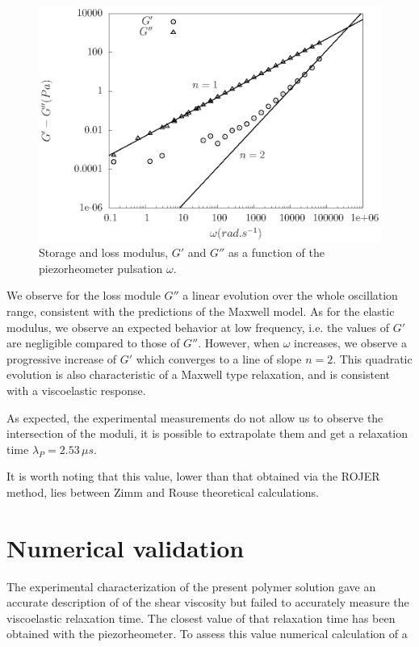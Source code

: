 \documentclass[twocolumn,10pt]{asme2ej}
\begin{document}
\begin{figure}[H]
    \begin{center}
    \includegraphics[width=12cm]{Moduli_bilan}
    \caption{Storage and loss modulus, $G'$ and $G''$ as a function of the piezorheometer pulsation $\omega$.}
    \label{piezo}
    \end{center}
\end{figure}

We observe for the loss module $G''$ a linear evolution over the whole oscillation range, consistent with the predictions of the Maxwell model. As for the elastic modulus, we observe an expected behavior at low frequency, i.e. the values of $ G'$ are negligible compared to those of $ G''$. However, when $\omega $ increases, we observe a progressive increase of $ G'$ which converges to a line of slope $ n = 2 $. This quadratic evolution is also characteristic of a Maxwell type relaxation, and  is consistent with a viscoelastic response. 

As expected, the experimental measurements do not allow us to observe the intersection of the moduli, it is possible to extrapolate them and get a relaxation time $ \lambda_{P} = 2.53 \, \mu s $.

It is worth noting that this value, lower than that obtained via the ROJER method, lies between Zimm and Rouse theoretical calculations.

\section{Numerical validation}

The experimental characterization of the present polymer solution gave an accurate description of of the shear viscosity but failed to accurately measure the viscoelastic relaxation time. The closest value of that relaxation time has been obtained with the piezorheometer. To assess this value numerical calculation of a 



\end{document}
